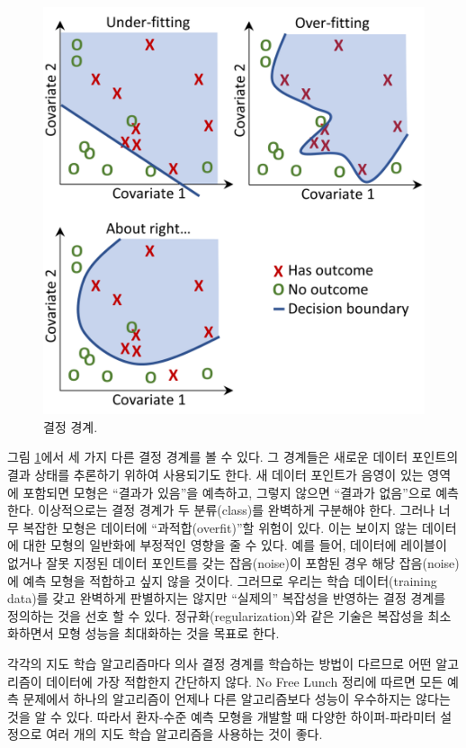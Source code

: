 \documentclass[11pt]{book}
\theoremstyle{definition}
\theoremstyle{definition}
\theoremstyle{definition}
\theoremstyle{remark}
\begin{document}
\begin{figure}

{\centering \includegraphics[width=0.8\linewidth]{images/PatientLevelPrediction/decisionBoundary} 

}

\caption{결정 경계.}\label{fig:decisionBoundary}
\end{figure}

그림 \ref{fig:decisionBoundary}에서 세 가지 다른 결정 경계를 볼 수 있다.
그 경계들은 새로운 데이터 포인트의 결과 상태를 추론하기 위하여
사용되기도 한다. 새 데이터 포인트가 음영이 있는 영역에 포함되면 모형은
``결과가 있음''을 예측하고, 그렇지 않으면 ``결과가 없음''으로 예측한다.
이상적으로는 결정 경계가 두 분류(class)를 완벽하게 구분해야 한다. 그러나
너무 복잡한 모형은 데이터에 ``과적합(overfit)''할 위험이 있다. 이는
보이지 않는 데이터에 대한 모형의 일반화에 부정적인 영향을 줄 수 있다.
예를 들어, 데이터에 레이블이 없거나 잘못 지정된 데이터 포인트를 갖는
잡음(noise)이 포함된 경우 해당 잡음(noise)에 예측 모형을 적합하고 싶지
않을 것이다. 그러므로 우리는 학습 데이터(training data)를 갖고 완벽하게
판별하지는 않지만 ``실제의'' 복잡성을 반영하는 결정 경계를 정의하는 것을
선호 할 수 있다. 정규화(regularization)와 같은 기술은 복잡성을
최소화하면서 모형 성능을 최대화하는 것을 목표로 한다.

각각의 지도 학습 알고리즘마다 의사 결정 경계를 학습하는 방법이 다르므로
어떤 알고리즘이 데이터에 가장 적합한지 간단하지 않다. No Free Lunch
정리에 따르면 모든 예측 문제에서 하나의 알고리즘이 언제나 다른
알고리즘보다 성능이 우수하지는 않다는 것을 알 수
있다. 따라서 환자-수준 예측 모형을 개발할 때 다양한
하이퍼-파라미터 설정으로 여러 개의 지도 학습 알고리즘을 사용하는 것이
좋다.
\end{document}
